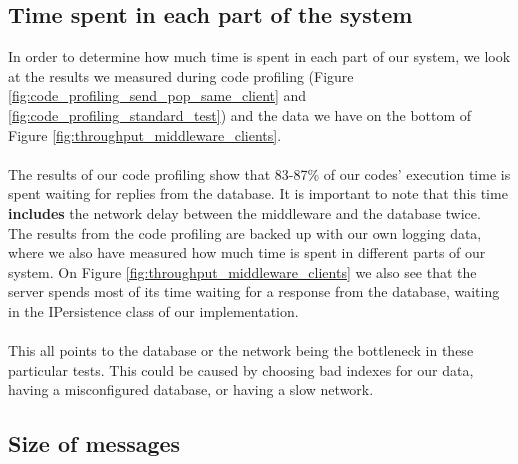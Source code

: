 \documentclass{article}
\begin{document}
        \subsection{Time spent in each part of the system}
            In order to determine how much time is spent in each part of our system, we look at the results we measured during code profiling (Figure \ref{fig:code_profiling_send_pop_same_client} and \ref{fig:code_profiling_standard_test}) and the data we have on the bottom of Figure \ref{fig:throughput_middleware_clients}.\\
            \\
            The results of our code profiling show that 83-87\% of our codes' execution time is spent waiting for replies from the database. It is important to note that this time \textbf{includes} the network delay between the middleware and the database twice.\\
            The results from the code profiling are backed up with our own logging data, where we also have measured how much time is spent in different parts of our system. On Figure \ref{fig:throughput_middleware_clients} we also see that the server spends most of its time waiting for a response from the database, waiting in the IPersistence class of our implementation.\\
            \\
            This all points to the database or the network being the bottleneck in these particular tests. This could be caused by choosing bad indexes for our data, having a misconfigured database, or having a slow network.


        \subsection{Size of messages}
\end{document}

